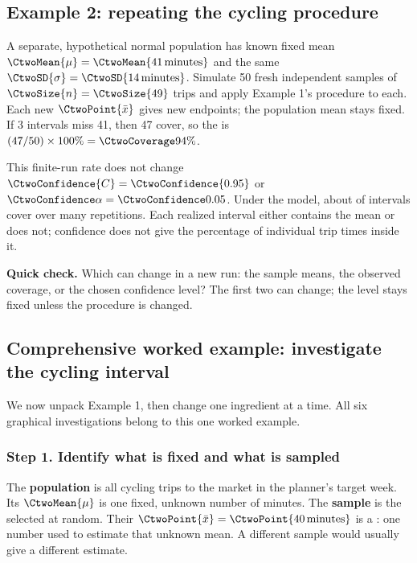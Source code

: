 \noindent\begin{minipage}{\linewidth}
\subsection{Example 2: repeating the cycling procedure}
\label{subsec:c2-coverage-example}
A separate, hypothetical normal population has known fixed mean $\CtwoMean{\mu}=\CtwoMean{41\,\text{minutes}}$ and the same $\CtwoSD{\sigma}=\CtwoSD{14\,\text{minutes}}$. Simulate 50 fresh independent samples of $\CtwoSize{n}=\CtwoSize{49}$ trips and apply Example 1's  procedure to each. Each new $\CtwoPoint{\bar{x}}$ gives new endpoints; the population mean stays fixed. If 3 intervals miss 41, then 47 cover, so the  is $(47/50)\times100\%=\CtwoCoverage{94\%}$.

This finite-run rate does not change $\CtwoConfidence{C}=\CtwoConfidence{0.95}$ or $\CtwoSignificance{\alpha}=\CtwoSignificance{0.05}$. Under the model, about  of intervals cover over many repetitions. Each realized interval either contains the mean or does not; confidence does not give the percentage of individual trip times inside it.

\textbf{Quick check.} Which can change in a new run: the sample means, the observed coverage, or the chosen confidence level? The first two can change; the level stays fixed unless the procedure is changed.
\par\vspace{3mm}
\end{minipage}\par

\clearpage

\subsection{Comprehensive worked example: investigate the cycling interval}
\label{subsec:c2-comprehensive}
We now unpack Example 1, then change one ingredient at a time. All six graphical
investigations belong to this one worked example.

\subsubsection*{Step 1. Identify what is fixed and what is sampled}
The \textbf{population} is all cycling trips to the market in the planner's target
week. Its  $\CtwoMean{\mu}$ is one fixed, unknown number
of minutes. The \textbf{sample} is the  selected at random.
Their  $\CtwoPoint{\bar{x}}=\CtwoPoint{40\,\text{minutes}}$
is a : one number used to estimate that unknown mean.
A different sample would usually give a different estimate.

